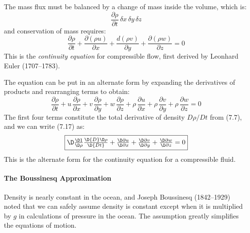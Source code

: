 The mass flux must be balanced by a change of mass inside the volume,
which is:
\begin{displaymath}
\frac{\partial\rho}{\partial{t}}\,\delta{x}\,\delta{y}\,\delta{z}
\end{displaymath}
and conservation of mass requires:
\begin{equation}
\frac{\partial\rho}{\partial{t}} + \frac{\partial{(\rho{u})}}{\partial{x}} + \frac{d(\rho{v})}{\partial{y}} + \frac{\partial{(\rho{w})}}{\partial{z}} = 0
\end{equation}
This is the \textit{continuity equation} for compressible flow, first derived by Leonhard
Euler (1707--1783).

The equation can be put in an alternate form by expanding the
derivatives of products and rearranging terms to obtain:
\begin{displaymath}
\frac{\partial{\rho}}{\partial{t}} + u\,\frac{\partial{\rho}}{\partial{x}} + v\,\frac{\partial{\rho}}{\partial{y}} + w\,\frac{\partial{\rho}}{\partial{z}} +
\rho\,\frac{\partial{u}}{\partial{x}} + \rho\,\frac{\partial{v}}{\partial{y}} + \rho\,\frac{\partial{w}}{\partial{z}} = 0
\end{displaymath}
The first four terms constitute the total derivative of density
$D\rho/Dt$ from (7.7), and we can write (7.17) as:
\begin{equation}
\fbox{$\D
\frac{\D1}{\D\rho}\frac{\D{D}\D\rho}{\D{Dt}} + \frac{\D\partial{u}}{\D\partial{x}} + \frac{\D\partial{v}}{\D\partial{y}} + \frac{\D\partial{w}}{\D\partial{z}} =
0
$}\end{equation}
This is the alternate form for the continuity equation for a
compressible fluid.

\paragraph{The Boussinesq Approximation}
Density is nearly constant in the
ocean, and Joseph Boussinesq (1842--1929) noted that we can safely
assume density is constant except when it is multiplied by $g$ in
calculations of pressure in the ocean. The assumption greatly
simplifies the equations of motion.

